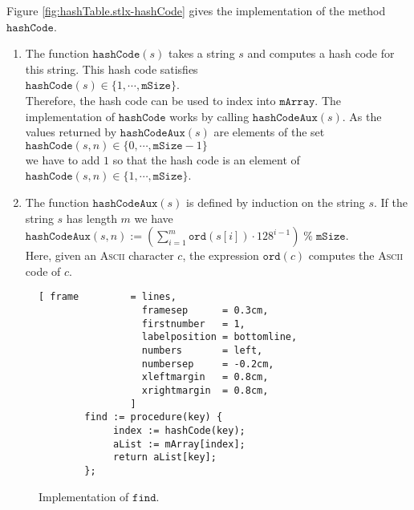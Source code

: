 Figure \ref{fig:hashTable.stlx-hashCode} gives the implementation of the method $\mathtt{hashCode}$.
\begin{enumerate}
\item The function $\mathtt{hashCode}(s)$ takes a string $s$ and computes a hash code for this string.
      This hash code satisfies
      \\[0.2cm]
      \hspace*{1.3cm}
      $\mathtt{hashCode}(s) \in \{ 1, \cdots, \mathtt{mSize} \}$.
      \\[0.2cm]
      Therefore, the hash code can be used to index into $\mathtt{mArray}$.  The implementation of
      $\mathtt{hashCode}$ works by calling $\mathtt{hashCodeAux}(s)$.  As the values returned by
      $\mathtt{hashCodeAux}(s)$ are elements of the set
      \\[0.2cm]
      \hspace*{1.3cm}
      $\mathtt{hashCode}(s,n) \in \{ 0, \cdots, \mathtt{mSize}-1 \}$      
      \\[0.2cm]
      we have to add $1$ so that the hash code is an element of 
      \\[0.2cm]
      \hspace*{1.3cm}
      $\mathtt{hashCode}(s,n) \in \{ 1, \cdots, \mathtt{mSize} \}$.      
\item The function $\mathtt{hashCodeAux}(s)$ is defined by induction on the string $s$.
      If the string $s$ has length $m$ we have
      \\[0.2cm]
      \hspace*{1.3cm}
      $\mathtt{hashCodeAux}(s,n) := \left(\sum\limits_{i=1}^m \mathtt{ord}(s[i]) \cdot 128^{i-1}\right) \;\texttt{\%}\; \mathtt{mSize}$.
      \\[0.2cm]
      Here, given an \textsc{Ascii} character $c$, the expression  $\mathtt{ord}(c)$ computes the
      \textsc{Ascii} code of  $c$.
\end{enumerate}

\begin{figure}[!ht]
\centering
\begin{Verbatim}[ frame         = lines, 
                  framesep      = 0.3cm, 
                  firstnumber   = 1,
                  labelposition = bottomline,
                  numbers       = left,
                  numbersep     = -0.2cm,
                  xleftmargin   = 0.8cm,
                  xrightmargin  = 0.8cm,
                ]
        find := procedure(key) {
             index := hashCode(key);
             aList := mArray[index];
             return aList[key];
        };
\end{Verbatim}
\vspace*{-0.3cm}
\caption{Implementation of $\mathtt{find}$.}
\label{fig:hashTable.stlx-find}
\end{figure}

